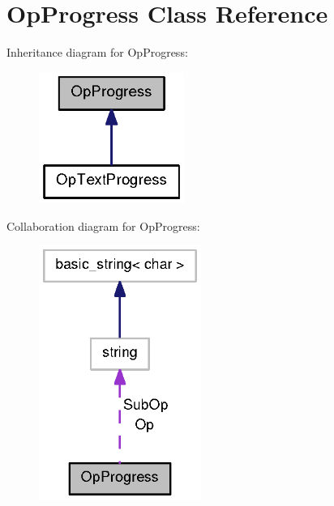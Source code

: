 \section{\-Op\-Progress \-Class \-Reference}
\label{classOpProgress}


\-Inheritance diagram for \-Op\-Progress\-:
\nopagebreak
\begin{figure}[H]
\begin{center}
\leavevmode
\includegraphics[width=134pt]{classOpProgress__inherit__graph}
\end{center}
\end{figure}


\-Collaboration diagram for \-Op\-Progress\-:
\nopagebreak
\begin{figure}[H]
\begin{center}
\leavevmode
\includegraphics[width=150pt]{classOpProgress__coll__graph}
\end{center}
\end{figure}
